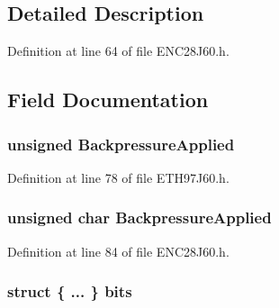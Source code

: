 \begin{DoxyCompactItemize}
\begin{tabbing}
\end{tabbing}\end{DoxyCompactItemize}


\subsection{Detailed Description}


Definition at line 64 of file E\+N\+C28\+J60.\+h.



\subsection{Field Documentation}
\hypertarget{union_t_x_s_t_a_t_u_s_a60edcaa70febe110d11a811773461746}{}
\subsubsection[{Backpressure\+Applied}]{\setlength{\rightskip}{0pt plus 5cm}unsigned Backpressure\+Applied}\label{union_t_x_s_t_a_t_u_s_a60edcaa70febe110d11a811773461746}


Definition at line 78 of file E\+T\+H97\+J60.\+h.

\hypertarget{union_t_x_s_t_a_t_u_s_adb32ce79750b0ebc011a99837ff72d2b}{}
\subsubsection[{Backpressure\+Applied}]{\setlength{\rightskip}{0pt plus 5cm}unsigned char Backpressure\+Applied}\label{union_t_x_s_t_a_t_u_s_adb32ce79750b0ebc011a99837ff72d2b}


Definition at line 84 of file E\+N\+C28\+J60.\+h.

\hypertarget{union_t_x_s_t_a_t_u_s_a2c849d275d70a70d30234dbd16af1e85}{}
\subsubsection[{bits}]{\setlength{\rightskip}{0pt plus 5cm}struct \{ ... \}   bits}\label{union_t_x_s_t_a_t_u_s_a2c849d275d70a70d30234dbd16af1e85}
\hypertarget{union_t_x_s_t_a_t_u_s_a4bf3d6c7a1b70c305f6a43db11094dce}{}
